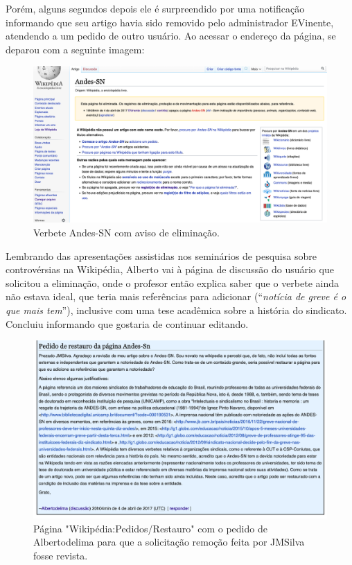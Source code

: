 Porém, alguns segundos depois ele é surpreendido por uma notificação informando que seu artigo havia sido removido pelo administrador EVinente, atendendo a um pedido de outro usuário. Ao acessar o endereço da página, se deparou com a seguinte imagem:

\begin{figure}[H]
    \centering
    \includegraphics[width=1\textwidth]{Images/andes.png}
    \caption{Verbete Andes-SN com aviso de eliminação.}
    \label{fig:verbete_andes}
\end{figure}

Lembrando das apresentações assistidas nos seminários de pesquisa sobre controvérsias na Wikipédia, Alberto vai à página de discussão do usuário que solicitou a eliminação, onde o profesor então explica saber que o verbete ainda não estava ideal, que teria mais referências para adicionar (``\textit{notícia de greve é o que mais tem}''), inclusive com uma tese acadêmica sobre a história do sindicato. Concluiu informando que gostaria de continuar editando.

\begin{figure}[H]
    \centering
    \includegraphics[width=1\textwidth]{Images/alberto-pedido-restauro.png}
    \caption{Página "Wikipédia:Pedidos/Restauro" com o pedido de Albertodelima para que a solicitação remoção feita por JMSilva fosse revista.}
    \label{fig:verbete_andes}
\end{figure}


